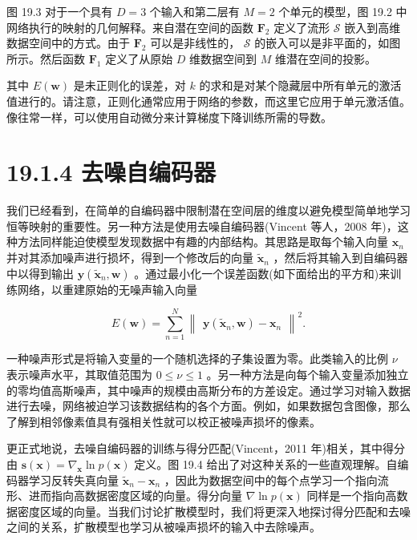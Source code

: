 \documentclass[10pt]{article}
\begin{document}
图 19.3 对于一个具有 \(D = 3\) 个输入和第二层有 \(M = 2\) 个单元的模型，图 19.2 中网络执行的映射的几何解释。来自潜在空间的函数 \({\mathbf{F}}_{2}\) 定义了流形 \(\mathcal{S}\) 嵌入到高维数据空间中的方式。由于 \({\mathbf{F}}_{2}\) 可以是非线性的， \(\mathcal{S}\) 的嵌入可以是非平面的，如图所示。然后函数 \({\mathbf{F}}_{1}\) 定义了从原始 \(D\) 维数据空间到 \(M\) 维潜在空间的投影。

其中 \(E\left( \mathbf{w}\right)\) 是未正则化的误差，对 \(k\) 的求和是对某个隐藏层中所有单元的激活值进行的。请注意，正则化通常应用于网络的参数，而这里它应用于单元激活值。像往常一样，可以使用自动微分来计算梯度下降训练所需的导数。

\section*{19.1.4 去噪自编码器}

我们已经看到，在简单的自编码器中限制潜在空间层的维度以避免模型简单地学习恒等映射的重要性。另一种方法是使用去噪自编码器(Vincent 等人，2008 年)，这种方法同样能迫使模型发现数据中有趣的内部结构。其思路是取每个输入向量 \({\mathbf{x}}_{n}\) 并对其添加噪声进行损坏，得到一个修改后的向量 \({\widetilde{\mathbf{x}}}_{n}\) ，然后将其输入到自编码器中以得到输出 \(\mathbf{y}\left( {{\widetilde{\mathbf{x}}}_{n},\mathbf{w}}\right)\) 。通过最小化一个误差函数(如下面给出的平方和)来训练网络，以重建原始的无噪声输入向量

\[
E\left( \mathbf{w}\right)  = \mathop{\sum }\limits_{{n = 1}}^{N}{\begin{Vmatrix}\mathbf{y}\left( {\widetilde{\mathbf{x}}}_{n},\mathbf{w}\right)  - {\mathbf{x}}_{n}\end{Vmatrix}}^{2}. \tag{19.3}
\]

一种噪声形式是将输入变量的一个随机选择的子集设置为零。此类输入的比例 \(\nu\) 表示噪声水平，其取值范围为 \(0 \leq  \nu  \leq  1\) 。另一种方法是向每个输入变量添加独立的零均值高斯噪声，其中噪声的规模由高斯分布的方差设定。通过学习对输入数据进行去噪，网络被迫学习该数据结构的各个方面。例如，如果数据包含图像，那么了解到相邻像素值具有强相关性就可以校正被噪声损坏的像素。

更正式地说，去噪自编码器的训练与得分匹配(Vincent，2011 年)相关，其中得分由 \(\mathbf{s}\left( \mathbf{x}\right)  = {\nabla }_{\mathbf{x}}\ln p\left( \mathbf{x}\right)\) 定义。图 19.4 给出了对这种关系的一些直观理解。自编码器学习反转失真向量 \({\widetilde{\mathbf{x}}}_{n} - {\mathbf{x}}_{n}\) ，因此为数据空间中的每个点学习一个指向流形、进而指向高数据密度区域的向量。得分向量 \(\nabla \ln p\left( \mathbf{x}\right)\) 同样是一个指向高数据密度区域的向量。当我们讨论扩散模型时，我们将更深入地探讨得分匹配和去噪之间的关系，扩散模型也学习从被噪声损坏的输入中去除噪声。
\end{document}
